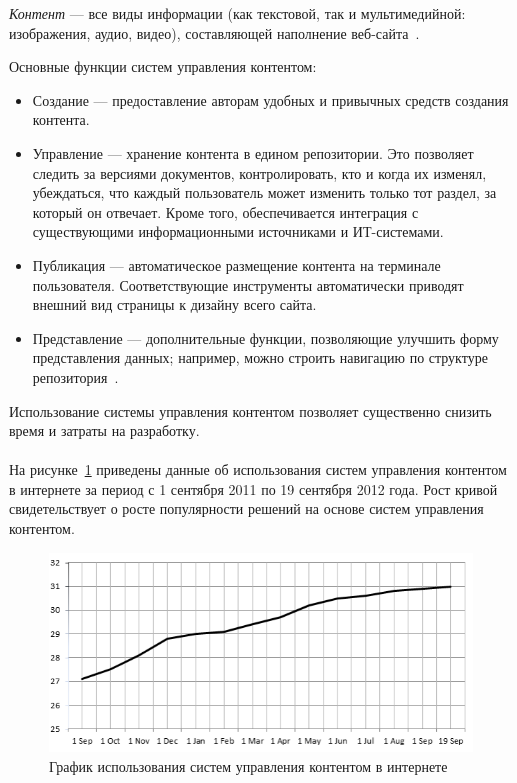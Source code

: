 \textit{Контент} --- все виды информации (как текстовой, так и мультимедийной: изображения, аудио, видео),
составляющей наполнение веб-сайта~\cite{wiki_content}.

Основные функции систем управления контентом:
\begin{itemize}
\item
  Создание --- предоставление авторам удобных и привычных средств создания контента.

\item
  Управление --- хранение контента в едином репозитории. 
  Это позволяет следить за версиями документов, контролировать, кто и когда их изменял, убеждаться,
  что каждый пользователь может изменить только тот раздел, за который он отвечает.
  Кроме того, обеспечивается интеграция с существующими информационными источниками и ИТ-системами.

\item
  Публикация --- автоматическое размещение контента на терминале пользователя. 
  Соответствующие инструменты автоматически приводят внешний вид страницы к дизайну всего сайта.

\item
  Представление --- дополнительные функции, позволяющие улучшить форму представления данных; например,
  можно строить навигацию по структуре репозитория~\cite{osp_cms_functions}.
\end{itemize}

Использование системы управления контентом позволяет существенно снизить время и затраты на разработку.

\paragraph{}
На рисунке~\ref{fig:cms_usage_dynamic} приведены данные об использования систем управления контентом в интернете за период
с 1 сентября 2011 по 19 сентября 2012 года. Рост кривой свидетельствует о росте популярности решений на 
основе систем управления контентом.

\begin{figure}[h]
  \centering
  \includegraphics[width=150mm]{pic/dynamic_cms_usage.png}
  \caption{График использования систем управления контентом в интернете}
  \label{fig:cms_usage_dynamic}
\end{figure}

